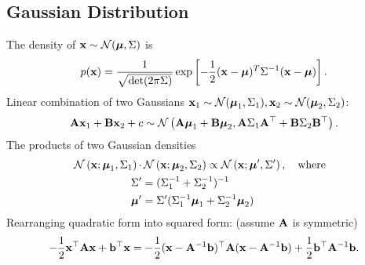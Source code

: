 \subsection{Gaussian Distribution}
The density of $\mathbf{x} \sim \mathcal{N}(\boldsymbol{\mu}, \Sigma)$ is 
\begin{equation}
p(\mathbf{x})=\frac{1}{\sqrt{\operatorname{det}(2 \pi {\Sigma})}} \exp \left[-\frac{1}{2}(\mathbf{x}-\boldsymbol{\mu})^{T} {\Sigma}^{-1}(\mathbf{x}-\boldsymbol{\mu})\right].
\end{equation}
Linear combination of two Gaussians $\mathbf{x}_1 \sim \mathcal{N}(\boldsymbol{\mu}_1, \Sigma_1), \mathbf{x}_2 \sim \mathcal{N}(\boldsymbol{\mu}_2, \Sigma_2)$:
\begin{equation}
	\mathbf{A} \mathbf{x}_1 + \mathbf{B} \mathbf{x}_2 + c \sim \mathcal{N}\left(\mathbf{A} \boldsymbol{\mu}_1 + \mathbf{B} \boldsymbol{\mu}_2, \mathbf{A}\Sigma_1\mathbf{A}^\top + \mathbf{B}\Sigma_2\mathbf{B}^\top\right).
\end{equation}
The products of two Gaussian densities
\begin{align}
	\mathcal{N}\left(\mathbf{x}; \boldsymbol{\mu}_1, \Sigma_1\right) \cdot & \,\mathcal{N}\left(\mathbf{x}; \boldsymbol{\mu}_2, \Sigma_2\right) \propto \mathcal{N}\left(\mathbf{x}; \boldsymbol{\mu}', \Sigma'\right), \quad \text{where}\ \  \\
	\Sigma' & = (\Sigma_1^{-1} + \Sigma_2^{-1})^{-1} \\
	\boldsymbol{\mu}' & = \Sigma' (\Sigma_1^{-1} \boldsymbol{\mu}_1 + \Sigma_2^{-1} \boldsymbol{\mu}_2)
\end{align}
Rearranging quadratic form into squared form: (assume $\mathbf{A}$ is symmetric)
\begin{equation}
	-\frac{1}{2} \mathbf{x}^\top \mathbf{A} \mathbf{x} + \mathbf{b}^\top \mathbf{x} = -\frac{1}{2} (\mathbf{x} - \mathbf{A}^{-1} \mathbf{b}) ^\top \mathbf{A} (\mathbf{x} - \mathbf{A}^{-1}\mathbf{b}) + \frac{1}{2} \mathbf{b}^\top \mathbf{A}^{-1} \mathbf{b}.
\end{equation}
